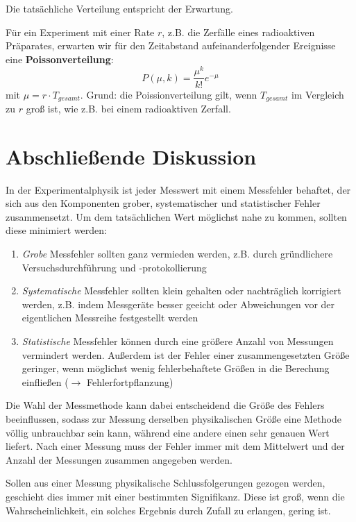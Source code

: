 Die tatsächliche Verteilung entspricht der Erwartung.

Für ein Experiment mit einer Rate $r$, z.B. die Zerfälle eines radioaktiven Präparates, erwarten wir für den Zeitabstand aufeinanderfolgender Ereignisse eine \textbf{Poissonverteilung}:
\begin{equation}
  P(\mu, k)=\frac{\mu^k}{k!}e^{-\mu}
  \label{expvert}
\end{equation}
mit $\mu=r\cdot T_{gesamt}$. Grund: die Poissionverteilung gilt, wenn $T_{gesamt}$ im Vergleich zu $r$ groß ist, wie z.B. bei einem radioaktiven Zerfall.
\section{Abschließende Diskussion}

In der Experimentalphysik ist jeder Messwert mit einem Messfehler behaftet, der sich aus den Komponenten grober, systematischer und statistischer Fehler zusammensetzt. Um dem tatsächlichen Wert möglichst nahe zu kommen, sollten diese minimiert werden:

\begin{enumerate}
  \item \emph{Grobe} Messfehler sollten ganz vermieden werden, z.B. durch gründlichere Versuchsdurchführung und -protokollierung
  \item \emph{Systematische} Messfehler sollten klein gehalten oder nachträglich korrigiert werden, z.B. indem Messgeräte besser geeicht oder Abweichungen vor der eigentlichen Messreihe festgestellt werden
  \item \emph{Statistische} Messfehler können durch eine größere Anzahl von Messungen vermindert werden. Außerdem ist der Fehler einer zusammengesetzten Größe geringer, wenn möglichst wenig fehlerbehaftete Größen in die Berechung einfließen ($\rightarrow$ Fehlerfortpflanzung)
\end{enumerate}

Die Wahl der Messmethode kann dabei entscheidend die Größe des Fehlers beeinflussen, sodass zur Messung derselben physikalischen Größe eine Methode völlig unbrauchbar sein kann, während eine andere einen sehr genauen Wert liefert. 
Nach einer Messung muss der Fehler immer mit dem Mittelwert und der Anzahl der Messungen zusammen angegeben werden.

Sollen aus einer Messung physikalische Schlussfolgerungen gezogen werden, geschieht dies immer mit einer bestimmten Signifikanz. Diese ist groß, wenn die Wahrscheinlichkeit, ein solches Ergebnis durch Zufall zu erlangen, gering ist.

\nocite{anleitung-ws2014}
